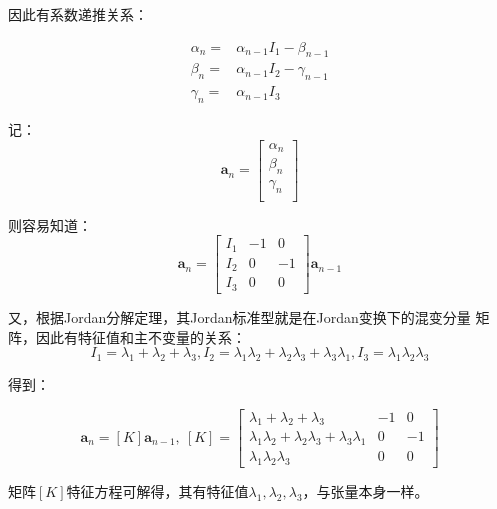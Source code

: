 \documentclass[UTF8,zihao=5]{ctexart}
\newcommand{\bm}[1]{{\mathbf{#1}}}
\begin{document}
因此有系数递推关系：

\begin{equation}
    \begin{aligned}
        \alpha_{n}= & \alpha_{n-1}I_1-\beta_{n-1}  \\
        \beta_{n}=  & \alpha_{n-1}I_2-\gamma_{n-1} \\
        \gamma_{n}= & \alpha_{n-1}I_3
    \end{aligned}
\end{equation}

记：
\begin{equation}
    \bm{a}_n=\begin{bmatrix}
        \alpha_n \\
        \beta_n  \\
        \gamma_n \\
    \end{bmatrix}
\end{equation}

则容易知道：
\begin{equation}
    \bm{a}_n=\begin{bmatrix}
        I_1 & -1 & 0  \\
        I_2 & 0  & -1 \\
        I_3 & 0  & 0
    \end{bmatrix}\bm{a}_{n-1}
\end{equation}

又，根据Jordan分解定理，其Jordan标准型就是在Jordan变换下的混变分量
矩阵，因此有特征值和主不变量的关系：
\begin{equation}
    I_1=\lambda_1+\lambda_2+\lambda_3,
    I_2=\lambda_1\lambda_2+\lambda_2\lambda_3+\lambda_3\lambda_1,
    I_3=\lambda_1\lambda_2\lambda_3
\end{equation}

得到：

\begin{equation}
    \bm{a}_n=[K]\bm{a}_{n-1},\ [K]=\begin{bmatrix}
        \lambda_1+\lambda_2+\lambda_3                            & -1 & 0  \\
        \lambda_1\lambda_2+\lambda_2\lambda_3+\lambda_3\lambda_1 & 0  & -1 \\
        \lambda_1\lambda_2\lambda_3                              & 0  & 0
    \end{bmatrix}
\end{equation}

矩阵$[K]$特征方程可解得，其有特征值$\lambda_1,\lambda_2,\lambda_3$，与张量本身一样。
\end{document}
